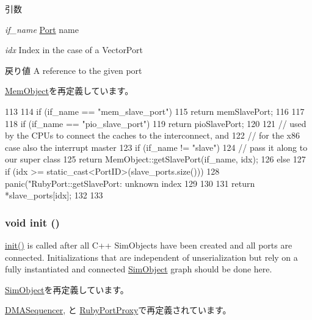 \begin{DoxyParams}{引数}
\item[{\em if\_\-name}]\hyperlink{classPort}{Port} name \item[{\em idx}]Index in the case of a VectorPort\end{DoxyParams}
\begin{DoxyReturn}{戻り値}
A reference to the given port 
\end{DoxyReturn}


\hyperlink{classMemObject_ac918a145092d7514ebc6dbd952dceafb}{MemObject}を再定義しています。


\begin{DoxyCode}
113 {
114     if (if_name == "mem_slave_port") {
115         return memSlavePort;
116     }
117 
118     if (if_name == "pio_slave_port")
119         return pioSlavePort;
120 
121     // used by the CPUs to connect the caches to the interconnect, and
122     // for the x86 case also the interrupt master
123     if (if_name != "slave") {
124         // pass it along to our super class
125         return MemObject::getSlavePort(if_name, idx);
126     } else {
127         if (idx >= static_cast<PortID>(slave_ports.size())) {
128             panic("RubyPort::getSlavePort: unknown index %
129         }
130 
131         return *slave_ports[idx];
132     }
133 }
\end{DoxyCode}
\hypertarget{classRubyPort_a02fd73d861ef2e4aabb38c0c9ff82947}{
\subsubsection[{init}]{\setlength{\rightskip}{0pt plus 5cm}void init ()}}
\label{classRubyPort_a02fd73d861ef2e4aabb38c0c9ff82947}
\hyperlink{classRubyPort_a02fd73d861ef2e4aabb38c0c9ff82947}{init()} is called after all C++ SimObjects have been created and all ports are connected. Initializations that are independent of unserialization but rely on a fully instantiated and connected \hyperlink{classSimObject}{SimObject} graph should be done here. 

\hyperlink{classSimObject_a02fd73d861ef2e4aabb38c0c9ff82947}{SimObject}を再定義しています。

\hyperlink{classDMASequencer_a02fd73d861ef2e4aabb38c0c9ff82947}{DMASequencer}, と \hyperlink{classRubyPortProxy_a02fd73d861ef2e4aabb38c0c9ff82947}{RubyPortProxy}で再定義されています。


